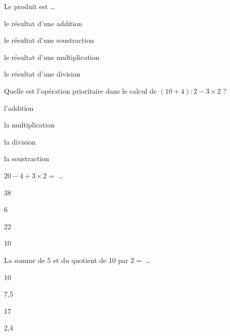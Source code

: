 


\begin{QCM}
  \begin{GroupeQCM}
    \begin{exercice}
      Le produit est \ldots
      \begin{ChoixQCM}{4}
      \item le résultat d'une addition
      \item le résultat d'une soustraction
      \item le résultat d'une multiplication
      \item le résultat d'une division
      \end{ChoixQCM}
\begin{corrige}
   \end{corrige}
    \end{exercice}

\begin{exercice}
      Quelle est l'opération prioritaire dans le calcul de $(10 + 4) : 2 - 3 \times 2$ ?
      \begin{ChoixQCM}{4}
      \item l'addition
      \item la multiplication
      \item la division
      \item la soustraction
      \end{ChoixQCM}
\begin{corrige}
   \end{corrige}
    \end{exercice}
    
\begin{exercice}
      $20 - 4 + 3 \times 2 =$ \ldots
      \begin{ChoixQCM}{4}
      \item 38
      \item 6
      \item 22
      \item 10
      \end{ChoixQCM}
\begin{corrige}
   \end{corrige}
    \end{exercice}
    
\begin{exercice}
      La somme de 5 et du quotient de 10 par $2 =$ \ldots
      \begin{ChoixQCM}{4}
      \item 10
      \item 7,5
      \item 17
      \item 2,4
      \end{ChoixQCM}
\begin{corrige}
   \end{corrige}
    \end{exercice}
    

\end{GroupeQCM}
\end{QCM}
